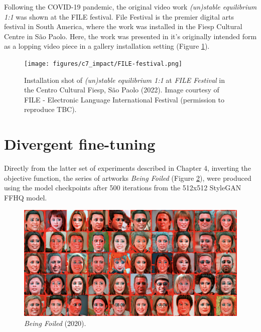 Following the COVID-19 pandemic, the original video work \textit{(un)stable equilibrium 1:1} was shown at the FILE festival. 
File Festival is the premier digital arts festival in South America, where the work was installed in the Fiesp Cultural Centre in São Paolo. 
Here, the work was presented in it's originally intended form as a lopping video piece in a gallery installation setting (Figure \ref{fig:c7:file-festival}).

\begin{figure}[!htb]
    \centering
    \captionsetup{justification=centering}
    \texttt{[image: figures/c7\_impact/FILE-festival.png]}
    \caption[Installation shot of \textit{(un)stable equilibrium} at FILE festival]{Installation shot of \textit{(un)stable equilibrium 1:1} at \textit{FILE Festival} in the Centro Cultural Fiesp, São Paolo (2022). Image courtesy of FILE - Electronic Language International Festival (permission to reproduce TBC).}
    \label{fig:c7:file-festival}
\end{figure}

\section{Divergent fine-tuning}
\label{c7:sec:divergent}


Directly from the latter set of experiments described in Chapter 4, inverting the objective function, the series of artworks \textit{Being Foiled} (Figure \ref{fig:c7:being-foiled}), were produced using the model checkpoints after 500 iterations from the 512x512 StyleGAN FFHQ model. 

\begin{figure}[!htb]
    \centering
    \captionsetup{justification=centering}
    \includegraphics[width=1\textwidth]{figures/c7_impact/being-foiled.png}
    \caption{\textit{Being Foiled} (2020).}
    \label{fig:c7:being-foiled}
\end{figure}

